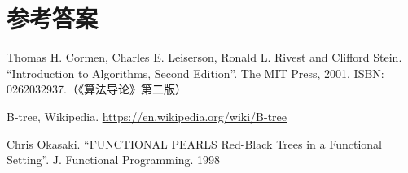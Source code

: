 \documentclass[b5paper]{ctexart}
\begin{document}
\ifx\wholebook\relax \else
\section{参考答案}
\shipoutAnswer

\begin{thebibliography}{99}

Thomas H. Cormen, Charles E. Leiserson, Ronald L. Rivest and Clifford Stein. ``Introduction to Algorithms, Second Edition''. The MIT Press, 2001. ISBN: 0262032937.（《算法导论》第二版）

B-tree, Wikipedia. \url{https://en.wikipedia.org/wiki/B-tree}

Chris Okasaki. ``FUNCTIONAL PEARLS Red-Black Trees in a Functional Setting''. J. Functional Programming. 1998

\end{thebibliography}
\end{document}
